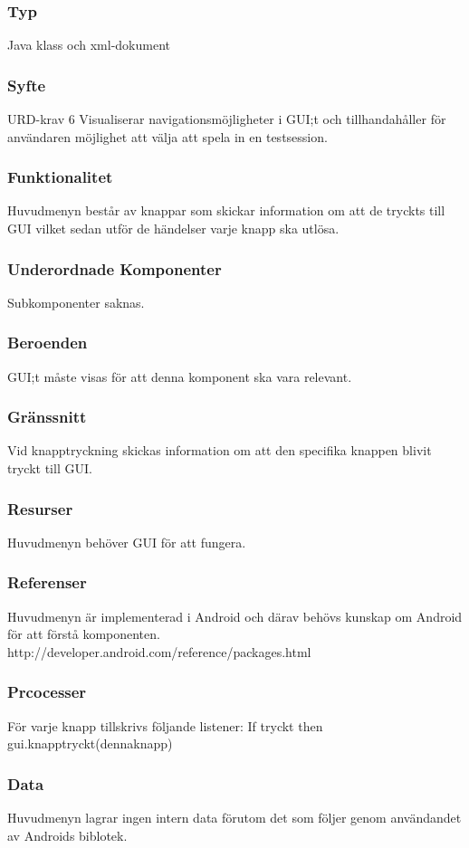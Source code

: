 \subsubsection{Typ}
Java klass och xml-dokument

\subsubsection{Syfte}
URD-krav 6
Visualiserar navigationsmöjligheter i GUI;t och tillhandahåller för användaren möjlighet att välja att spela in en testsession. 

\subsubsection{Funktionalitet}
Huvudmenyn består av knappar som skickar information om att de tryckts till GUI vilket sedan utför de händelser varje knapp  ska utlösa.

\subsubsection{Underordnade Komponenter}
Subkomponenter saknas.

\subsubsection{Beroenden}
GUI;t måste visas för att denna komponent ska vara relevant.

\subsubsection{Gränssnitt}
Vid knapptryckning skickas information om att den specifika knappen blivit tryckt till GUI.

\subsubsection{Resurser}
Huvudmenyn behöver GUI för att fungera.

\subsubsection{Referenser}
Huvudmenyn är implementerad i Android och därav behövs kunskap om Android för att förstå komponenten.
http://developer.android.com/reference/packages.html

\subsubsection{Prcocesser}
För varje knapp tillskrivs följande listener:
If tryckt
then gui.knapptryckt(dennaknapp)

\subsubsection{Data}
Huvudmenyn lagrar ingen intern data förutom det som följer genom användandet av Androids biblotek.